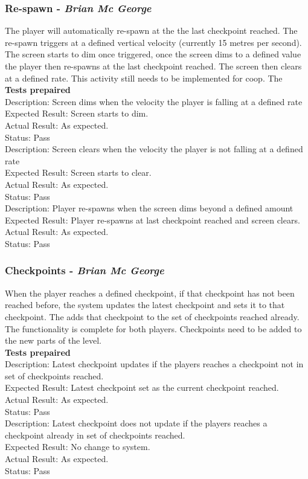 \documentclass[a4paper,10pt]{article}
\begin{document}
\subsubsection{Re-spawn - \textit{Brian Mc George}}
The player will automatically re-spawn at the the last checkpoint reached. The re-spawn triggers at a defined vertical velocity (currently 15 metres per second). The screen starts to dim once triggered, once the screen dims to a defined value the player then re-spawns at the last checkpoint reached. The screen then clears at a defined rate. This activity still needs to be implemented for coop. The 
\smallskip\\\textbf{Tests prepaired}\\
Description: Screen dims when the velocity the player is falling at a defined rate\\
Expected Result: Screen starts to dim.\\
Actual Result:  As expected.\\
Status: Pass
\smallskip\\
Description: Screen clears when the velocity the player is not falling at a defined rate\\
Expected Result: Screen starts to clear.\\
Actual Result:  As expected.\\
Status: Pass
\smallskip\\
Description: Player re-spawns when the screen dims beyond a defined amount\\
Expected Result: Player re-spawns at last checkpoint reached and screen clears.\\
Actual Result: As expected.\\
Status: Pass
\subsubsection{Checkpoints - \textit{Brian Mc George}}
When the player reaches a defined checkpoint, if that checkpoint has not been reached before, the system updates the latest checkpoint and sets it to that checkpoint. The adds that checkpoint to the set of checkpoints reached already. The functionality is complete for both players. Checkpoints need to be added to the new parts of the level.
\smallskip\\\textbf{Tests prepaired}\\
Description: Latest checkpoint updates if the players reaches a checkpoint not in set of checkpoints reached.\\
Expected Result: Latest checkpoint set as the current checkpoint reached.\\
Actual Result: As expected.\\
Status: Pass
\smallskip\\
Description: Latest checkpoint does not update if the players reaches a checkpoint already in set of checkpoints reached.\\
Expected Result: No change to system.\\
Actual Result: As expected.\\
Status: Pass
\end{document}
